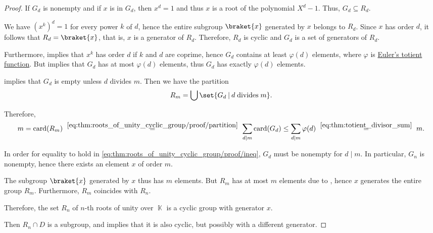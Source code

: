 \begin{proof}
  If \( G_d \) is nonempty and if \( x \) is in \( G_d \), then \( x^d = 1 \) and thus \( x \) is a root of the polynomial \( X^d - 1 \). Thus, \( G_d \subseteq R_d \).

  We have \( (x^k)^d = 1 \) for every power \( k \) of \( d \), hence the entire subgroup \( \braket{ x } \) generated by \( x \) belongs to \( R_d \). Since \( x \) has order \( d \), it follows that \( R_d = \braket{ x } \), that is, \( x \) is a generator of \( R_d \). Therefore, \( R_d \) is cyclic and \( G_d \) is a set of generators of \( R_d \).

  Furthermore,  implies that \( x^k \) has order \( d \) if \( k \) and \( d \) are coprime, hence \( G_d \) contains at least \( \varphi(d) \) elements, where \( \varphi \) is \hyperref[def:eulers_totient_function]{Euler's totient function}. But  implies that \( G_d \) has at most \( \varphi(d) \) elements, thus \( G_d \) has exactly \( \varphi(d) \) elements.

   implies that \( G_d \) is empty unless \( d \) divides \( m \). Then we have the partition
  \begin{equation}\label{eq:thm:roots_of_unity_cyclic_group/proof/partition}
    R_m = \bigcup \set{ G_d \given d \T{divides} m }.
  \end{equation}

  Therefore,
  \begin{equation}\label{eq:thm:roots_of_unity_cyclic_group/proof/ineq}
    m
    =
    \card(R_m)
    \reloset {\eqref{eq:thm:roots_of_unity_cyclic_group/proof/partition}} =
    \sum_{d \mid m} \card(G_d)
    \leq
    \sum_{d \mid m} \varphi(d)
    \reloset {\eqref{eq:thm:totient_divisor_sum}} =
    m.
  \end{equation}

  In order for equality to hold in \eqref{eq:thm:roots_of_unity_cyclic_group/proof/ineq}, \( G_d \) must be nonempty for \( d \mid m \). In particular, \( G_n \) is nonempty, hence there exists an element \( x \) of order \( m \).

  The subgroup \( \braket{ x } \) generated by \( x \) thus has \( m \) elements. But \( R_m \) has at most \( m \) elements due to , hence \( x \) generates the entire group \( R_m \). Furthermore, \( R_m \) coincides with \( R_n \).

  Therefore, the set \( R_n \) of \( n \)-th roots of unity over \( \BbbK \) is a cyclic group with generator \( x \).

  Then \( R_n \cap D \) is a subgroup, and  implies that it is also cyclic, but possibly with a different generator.
\end{proof}

